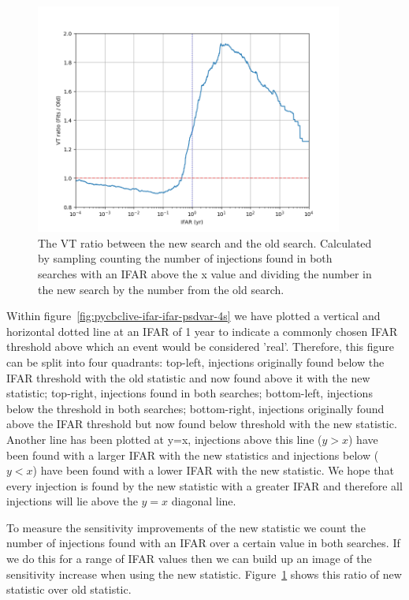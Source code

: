 \begin{figure}
\begin{minipage}[t]{1.0\linewidth}
    \includegraphics[width=0.9\textwidth]{images/pycbclive/ratio.png}
    \caption{The VT ratio between the new search and the old search. Calculated by sampling counting the number of injections found in both searches with an IFAR above the x value and dividing the number in the new search by the number from the old search.}
    \label{fig:pycbclive-psdvar-4s-sensitivity}

  \end{minipage}
\end{figure}
%
Within figure~\ref{fig:pycbclive-ifar-ifar-psdvar-4s} we have plotted a vertical and horizontal dotted line at an IFAR of 1 year to indicate a commonly chosen IFAR threshold above which an event would be considered 'real'. Therefore, this figure can be split into four quadrants: top-left, injections originally found below the IFAR threshold with the old statistic and now found above it with the new statistic; top-right, injections found in both searches; bottom-left, injections below the threshold in both searches; bottom-right, injections originally found above the IFAR threshold but now found below threshold with the new statistic. Another line has been plotted at y=x, injections above this line ($y > x$) have been found with a larger IFAR with the new statistics and injections below ($y < x$) have been found with a lower IFAR with the new statistic. We hope that every injection is found by the new statistic with a greater IFAR and therefore all injections will lie above the $y = x$ diagonal line.

To measure the sensitivity improvements of the new statistic we count the number of injections found with an IFAR over a certain value in both searches. If we do this for a range of IFAR values then we can build up an image of the sensitivity increase when using the new statistic. Figure~\ref{fig:pycbclive-psdvar-4s-sensitivity} shows this ratio of new statistic over old statistic.


